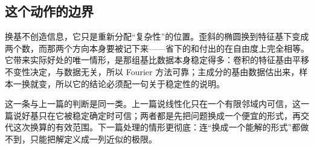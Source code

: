 \subsection{这个动作的边界}

换基不创造信息，它只是重新分配``复杂性''的位置。歪斜的椭圆换到特征基下变成两个数，而那两个方向本身要被记下来——省下的和付出的在自由度上完全相等。它带来实际好处的唯一情形，是那组基比数据本身稳定得多：卷积的特征基由平移不变性决定，与数据无关，所以 Fourier 方法可靠；主成分的基由数据估出来，样本一换就变，所以它的结论必须配一句关于稳定性的说明。

这一条与上一篇的判断是同一类。上一篇说线性化只在一个有限邻域内可信，这一篇说好基只在它被稳定确定时可信；两者都是先把问题换成一个便宜的形式，再交代这次换算的有效范围。下一篇处理的情形更彻底：连``换成一个能解的形式''都做不到，只能把解定义成一列近似的极限。
